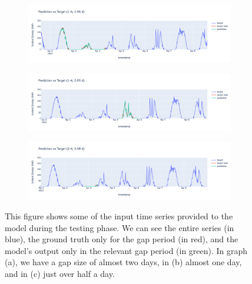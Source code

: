 \begin{figure}[H]
	\centering
	\begin{subfigure}{\textwidth}
		\centering
		\includegraphics[width=\textwidth]{chapters/3_models/imgs/gab/eval/gabplotall1.png}
		\caption{}
	\end{subfigure}
	\begin{subfigure}{\textwidth}
		\centering
		\includegraphics[width=\textwidth]{chapters/3_models/imgs/gab/eval/gabplotall2.png}
		\caption{}
	\end{subfigure}
	\begin{subfigure}{\textwidth}
		\centering
		\includegraphics[width=\textwidth]{chapters/3_models/imgs/gab/eval/gabplotall3.png}
		\caption{}
	\end{subfigure}
	\caption{This figure shows some of the input time series provided to the model during the testing phase. We can see the entire series (in blue), the ground truth only for the gap period (in red), and the model's output only in the relevant gap period (in green). In graph (a), we have a gap size of almost two days, in (b) almost one day, and in (c) just over half a day.}
	\label{fig:gaballplotsgaps}
\end{figure}


